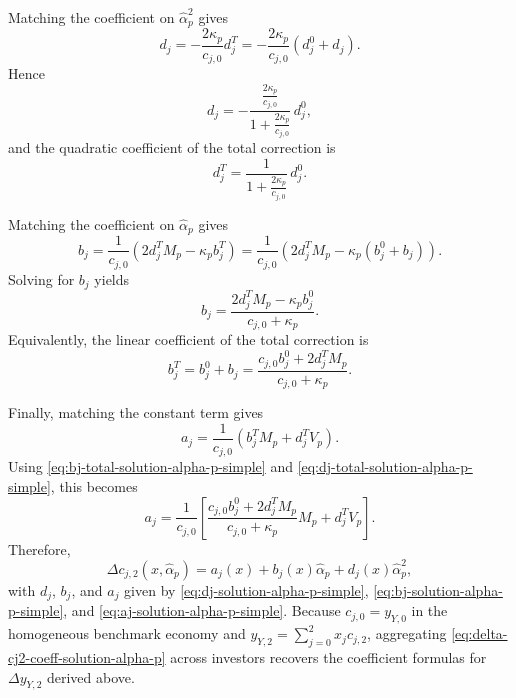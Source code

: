 Matching the coefficient on $\hat{\alpha}_p^2$ gives
\begin{equation}
    d_j=-\frac{2\kappa_p}{c_{j,0}}d_j^T
    =-\frac{2\kappa_p}{c_{j,0}}(d_j^0+d_j).
\end{equation}
Hence
\begin{equation}\label{eq:dj-solution-alpha-p-simple}
    d_j
    =-\frac{\frac{2\kappa_p}{c_{j,0}}}{1+\frac{2\kappa_p}{c_{j,0}}}\,d_j^0,
\end{equation}
and the quadratic coefficient of the total correction is
\begin{equation}\label{eq:dj-total-solution-alpha-p-simple}
    d_j^T
    =\frac{1}{1+\frac{2\kappa_p}{c_{j,0}}}\,d_j^0.
\end{equation}

Matching the coefficient on $\hat{\alpha}_p$ gives
\begin{equation}
    b_j
    =\frac{1}{c_{j,0}}\left(2d_j^T M_p-\kappa_p b_j^T\right)
    =\frac{1}{c_{j,0}}\left(2d_j^T M_p-\kappa_p(b_j^0+b_j)\right).
\end{equation}
Solving for $b_j$ yields
\begin{equation}\label{eq:bj-solution-alpha-p-simple}
    b_j
    =\frac{2d_j^T M_p-\kappa_p b_j^0}{c_{j,0}+\kappa_p}.
\end{equation}
Equivalently, the linear coefficient of the total correction is
\begin{equation}\label{eq:bj-total-solution-alpha-p-simple}
    b_j^T
    =b_j^0+b_j
    =\frac{c_{j,0}b_j^0+2d_j^T M_p}{c_{j,0}+\kappa_p}.
\end{equation}

Finally, matching the constant term gives
\begin{equation}
    a_j
    =\frac{1}{c_{j,0}}\left(b_j^T M_p+d_j^T V_p\right).
\end{equation}
Using \eqref{eq:bj-total-solution-alpha-p-simple} and \eqref{eq:dj-total-solution-alpha-p-simple}, this becomes
\begin{equation}\label{eq:aj-solution-alpha-p-simple}
    a_j
    =\frac{1}{c_{j,0}}\left[
        \frac{c_{j,0}b_j^0+2d_j^T M_p}{c_{j,0}+\kappa_p}M_p
        +d_j^T V_p
    \right].
\end{equation}
Therefore,
\begin{equation}\label{eq:delta-cj2-coeff-solution-alpha-p}
    \Delta c_{j,2}(x,\hat{\alpha}_p)
    =a_j(x)+b_j(x)\hat{\alpha}_p+d_j(x)\hat{\alpha}_p^2,
\end{equation}
with $d_j$, $b_j$, and $a_j$ given by \eqref{eq:dj-solution-alpha-p-simple}, \eqref{eq:bj-solution-alpha-p-simple}, and \eqref{eq:aj-solution-alpha-p-simple}.
Because $c_{j,0}=y_{Y,0}$ in the homogeneous benchmark economy and $y_{Y,2}=\sum_{j=0}^2x_jc_{j,2}$, aggregating \eqref{eq:delta-cj2-coeff-solution-alpha-p} across investors recovers the coefficient formulas for $\Delta y_{Y,2}$ derived above.

